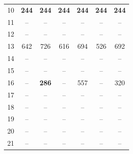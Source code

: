 \begin{table}[H]
{\begin{tabular}{ccccccc}
                10 & \textbf{244} &     \textbf{244} &  \textbf{244} &  \textbf{244} &  \textbf{244} &  \textbf{244} \\

                11 & -- &       -- &    -- &    -- &    -- &    -- \\
                12 & -- &       -- &    -- &    -- &    -- &    -- \\
                13 & 642 &      726 &   616 &   694 &   526 &   692 \\
                14 & -- &       -- &    -- &    -- &    -- &    -- \\
                15 & -- &       -- &    -- &    -- &    -- &    -- \\
                16 & -- &       \textbf{286} &  -- &    557 &   -- &    320 \\
                17 & -- &       -- &    -- &    -- &    -- &    -- \\
                18 & -- &       -- &    -- &    -- &    -- &    -- \\
                19 & -- &       -- &    -- &    -- &    -- &    -- \\
                20 & -- &       -- &    -- &    -- &    -- &    -- \\
                21 & -- &       -- &    -- &    -- &    -- &    -- \\
                \bottomrule
        \end{tabular}}
\end{table}
